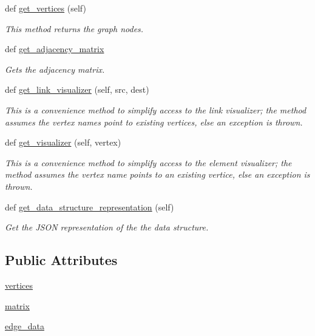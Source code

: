 \begin{DoxyCompactItemize}
def \hyperlink{class_graph_adj_matrix_1_1_graph_adj_matrix_a1221c2ab4bd7594911567f4497287525}{get\+\_\+vertices} (self)
\begin{DoxyCompactList}\small\item\em This method returns the graph nodes. \end{DoxyCompactList}\item 
def \hyperlink{class_graph_adj_matrix_1_1_graph_adj_matrix_a6da95c569042f0ae0f9c980a18d10dd4}{get\+\_\+adjacency\+\_\+matrix}
\begin{DoxyCompactList}\small\item\em Gets the adjacency matrix. \end{DoxyCompactList}\item 
def \hyperlink{class_graph_adj_matrix_1_1_graph_adj_matrix_a260927686c8d3e10e70d8d56ff350a8f}{get\+\_\+link\+\_\+visualizer} (self, src, dest)
\begin{DoxyCompactList}\small\item\em This is a convenience method to simplify access to the link visualizer; the method assumes the vertex names point to existing vertices, else an exception is thrown. \end{DoxyCompactList}\item 
def \hyperlink{class_graph_adj_matrix_1_1_graph_adj_matrix_a840c9b3b8962e090148457ca268324da}{get\+\_\+visualizer} (self, vertex)
\begin{DoxyCompactList}\small\item\em This is a convenience method to simplify access to the element visualizer; the method assumes the vertex name points to an existing vertice, else an exception is thrown. \end{DoxyCompactList}\item 
def \hyperlink{class_graph_adj_matrix_1_1_graph_adj_matrix_a7ae807af31cab18bb62ce87b3e960dbb}{get\+\_\+data\+\_\+structure\+\_\+representation} (self)
\begin{DoxyCompactList}\small\item\em Get the J\+S\+O\+N representation of the the data structure. \end{DoxyCompactList}\end{DoxyCompactItemize}
\subsection*{Public Attributes}
\begin{DoxyCompactItemize}
\item 
\hyperlink{class_graph_adj_matrix_1_1_graph_adj_matrix_a85c454d09e82706b00563af339c0147f}{vertices}
\item 
\hyperlink{class_graph_adj_matrix_1_1_graph_adj_matrix_aba658e4996d8a25b8c7260bb0f936ea7}{matrix}
\item 
\hyperlink{class_graph_adj_matrix_1_1_graph_adj_matrix_a22779fb67205f376ba507b01727801e4}{edge\+\_\+data}
\end{DoxyCompactItemize}
